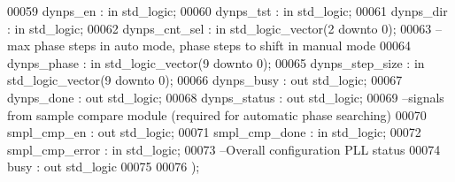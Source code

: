 \begin{DoxyCode}
00059    \textcolor{vhdlchar}{dynps_en}          \textcolor{vhdlchar}{:} \textcolor{keywordflow}{in} \textcolor{comment}{std\_logic};
00060    \textcolor{vhdlchar}{dynps_tst}         \textcolor{vhdlchar}{:} \textcolor{keywordflow}{in} \textcolor{comment}{std\_logic};
00061    \textcolor{vhdlchar}{dynps_dir}         \textcolor{vhdlchar}{:} \textcolor{keywordflow}{in} \textcolor{comment}{std\_logic};
00062    \textcolor{vhdlchar}{dynps_cnt_sel}     \textcolor{vhdlchar}{:} \textcolor{keywordflow}{in} \textcolor{comment}{std\_logic\_vector}\textcolor{vhdlchar}{(}\textcolor{vhdllogic}{}\textcolor{vhdllogic}{2} \textcolor{keywordflow}{downto} \textcolor{vhdllogic}{}\textcolor{vhdllogic}{0}\textcolor{vhdlchar}{)};
00063 \textcolor{keyword}{   -- max phase steps in auto mode, phase steps to shift in manual mode}
00064    \textcolor{vhdlchar}{dynps_phase}       \textcolor{vhdlchar}{:} \textcolor{keywordflow}{in} \textcolor{comment}{std\_logic\_vector}\textcolor{vhdlchar}{(}\textcolor{vhdllogic}{}\textcolor{vhdllogic}{9} \textcolor{keywordflow}{downto} \textcolor{vhdllogic}{}\textcolor{vhdllogic}{0}\textcolor{vhdlchar}{)};
00065    \textcolor{vhdlchar}{dynps_step_size}   \textcolor{vhdlchar}{:} \textcolor{keywordflow}{in} \textcolor{comment}{std\_logic\_vector}\textcolor{vhdlchar}{(}\textcolor{vhdllogic}{}\textcolor{vhdllogic}{9} \textcolor{keywordflow}{downto} \textcolor{vhdllogic}{}\textcolor{vhdllogic}{0}\textcolor{vhdlchar}{)};
00066    \textcolor{vhdlchar}{dynps_busy}        \textcolor{vhdlchar}{:} \textcolor{keywordflow}{out} \textcolor{comment}{std\_logic};
00067    \textcolor{vhdlchar}{dynps_done}        \textcolor{vhdlchar}{:} \textcolor{keywordflow}{out} \textcolor{comment}{std\_logic};
00068    \textcolor{vhdlchar}{dynps_status}      \textcolor{vhdlchar}{:} \textcolor{keywordflow}{out} \textcolor{comment}{std\_logic};
00069 \textcolor{keyword}{   --signals from sample compare module (required for automatic phase searching)}
00070    \textcolor{vhdlchar}{smpl_cmp_en}       \textcolor{vhdlchar}{:} \textcolor{keywordflow}{out} \textcolor{comment}{std\_logic};
00071    \textcolor{vhdlchar}{smpl_cmp_done}     \textcolor{vhdlchar}{:} \textcolor{keywordflow}{in} \textcolor{comment}{std\_logic};
00072    \textcolor{vhdlchar}{smpl_cmp_error}    \textcolor{vhdlchar}{:} \textcolor{keywordflow}{in} \textcolor{comment}{std\_logic};
00073 \textcolor{keyword}{   --Overall configuration PLL status}
00074    \textcolor{vhdlchar}{busy}              \textcolor{vhdlchar}{:} \textcolor{keywordflow}{out} \textcolor{comment}{std\_logic}
00075    
00076    \textcolor{vhdlchar}{)};

\end{DoxyCode}
